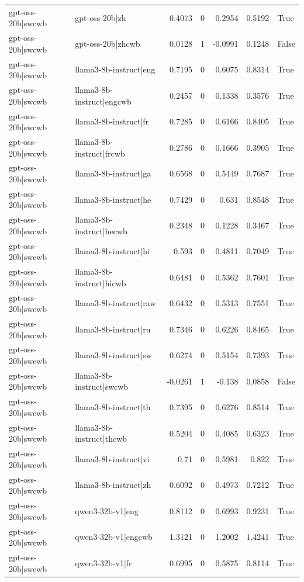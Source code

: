 \begin{table}
\begin{tabular}{l l r r r r l}
gpt-oss-20b|swcwb & gpt-oss-20b|zh & 0.4073 & 0 & 0.2954 & 0.5192 & True \\
gpt-oss-20b|swcwb & gpt-oss-20b|zhcwb & 0.0128 & 1 & -0.0991 & 0.1248 & False \\
gpt-oss-20b|swcwb & llama3-8b-instruct|eng & 0.7195 & 0 & 0.6075 & 0.8314 & True \\
gpt-oss-20b|swcwb & llama3-8b-instruct|engcwb & 0.2457 & 0 & 0.1338 & 0.3576 & True \\
gpt-oss-20b|swcwb & llama3-8b-instruct|fr & 0.7285 & 0 & 0.6166 & 0.8405 & True \\
gpt-oss-20b|swcwb & llama3-8b-instruct|frcwb & 0.2786 & 0 & 0.1666 & 0.3905 & True \\
gpt-oss-20b|swcwb & llama3-8b-instruct|ga & 0.6568 & 0 & 0.5449 & 0.7687 & True \\
gpt-oss-20b|swcwb & llama3-8b-instruct|he & 0.7429 & 0 & 0.631 & 0.8548 & True \\
gpt-oss-20b|swcwb & llama3-8b-instruct|hecwb & 0.2348 & 0 & 0.1228 & 0.3467 & True \\
gpt-oss-20b|swcwb & llama3-8b-instruct|hi & 0.593 & 0 & 0.4811 & 0.7049 & True \\
gpt-oss-20b|swcwb & llama3-8b-instruct|hicwb & 0.6481 & 0 & 0.5362 & 0.7601 & True \\
gpt-oss-20b|swcwb & llama3-8b-instruct|raw & 0.6432 & 0 & 0.5313 & 0.7551 & True \\
gpt-oss-20b|swcwb & llama3-8b-instruct|ru & 0.7346 & 0 & 0.6226 & 0.8465 & True \\
gpt-oss-20b|swcwb & llama3-8b-instruct|sw & 0.6274 & 0 & 0.5154 & 0.7393 & True \\
gpt-oss-20b|swcwb & llama3-8b-instruct|swcwb & -0.0261 & 1 & -0.138 & 0.0858 & False \\
gpt-oss-20b|swcwb & llama3-8b-instruct|th & 0.7395 & 0 & 0.6276 & 0.8514 & True \\
gpt-oss-20b|swcwb & llama3-8b-instruct|thcwb & 0.5204 & 0 & 0.4085 & 0.6323 & True \\
gpt-oss-20b|swcwb & llama3-8b-instruct|vi & 0.71 & 0 & 0.5981 & 0.822 & True \\
gpt-oss-20b|swcwb & llama3-8b-instruct|zh & 0.6092 & 0 & 0.4973 & 0.7212 & True \\
gpt-oss-20b|swcwb & qwen3-32b-v1|eng & 0.8112 & 0 & 0.6993 & 0.9231 & True \\
gpt-oss-20b|swcwb & qwen3-32b-v1|engcwb & 1.3121 & 0 & 1.2002 & 1.4241 & True \\
gpt-oss-20b|swcwb & qwen3-32b-v1|fr & 0.6995 & 0 & 0.5875 & 0.8114 & True \\

\end{tabular}
\end{table}
